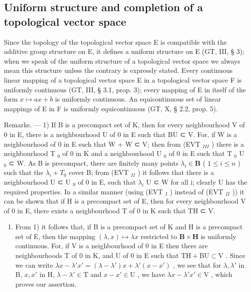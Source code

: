 \subsection{Uniform structure and completion of a topological vector space}

Since the topology of the topological vector space E is compatible with the additive group structure on E, it defines a uniform structure on E (GT, III, § 3); when we speak of the uniform structure of a topological vector space we always mean this structure unless the contrary is expressly stated. Every continuous linear mapping of a topological vector space E in a topological vector space F is uniformly continuous (GT, III, § 3.1, prop. 3); every mapping of E in itself of the form \(x \mapsto ax + b\) is uniformly continuous. An equicontinuous set of linear mappings of E in F is uniformly equicontinuous (GT, X, § 2.2, prop. 5).

Remarks. --- 1) If B is a precompact set of K, then for every neighbourhood V of 0 in E, there is a neighbourhood U of 0 in E such that BU ⊂ V. For, if W is a neighbourhood of 0 in E such that W + W ⊂ V; then from (EVT \(_{III}\) ) there is a neighbourhood T \(_{0}\) of 0 in K and a neighbourhood U \(_{0}\) of 0 in E such that T \(_{0}\) U \(_{0}\) ⊂ W. As B is precompact, there are finitely many points \(\lambda_{i} \in \mathbf{B}\) ( \(1 \leqslant i \leqslant n\) ) such that the \(\lambda_{i} + T_{0}\) cover B; from (EVT \(_{II}\) ) it follows that there is a neighbourhood U ⊂ U \(_{0}\) of 0 in E, such that \(\lambda_{i}\) U ⊂ W for all i; clearly U has the required properties. In a similar manner (using (EVT \(_{I}\) ) instead of (EVT \(_{II}\) )) it can be shown that if H is a precompact set of E, then for every neighbourhood V of 0 in E, there exists a neighbourhood T of 0 in K such that TH ⊂ V.

\begin{enumerate}
\def\labelenumi{\arabic{enumi})}
\setcounter{enumi}{1}
\tightlist
\item
  From 1) it follows that, if B is a precompact set of K and H is a precompact set of E, then the mapping \((\lambda, x) \mapsto \lambda x\) restricted to \(\mathbf{B} \times \mathbf{H}\) is uniformly continuous. For, if V is a neighbourhood of 0 in E then there are neighbourhoods T of 0 in K, and U of 0 in E such that \(\mathrm{TH} + \mathrm{BU} \subset \mathrm{V}\) . Since we can write \(\lambda x - \lambda' x' = (\lambda - \lambda') x + \lambda'(x - x')\) , we see that for \(\lambda, \lambda'\) in B, \(x, x'\) in H, \(\lambda - \lambda' \in \mathrm{T}\) and \(x - x' \in \mathrm{U}\) , we have \(\lambda x - \lambda' x' \in \mathrm{V}\) , which proves our assertion.
\end{enumerate}

